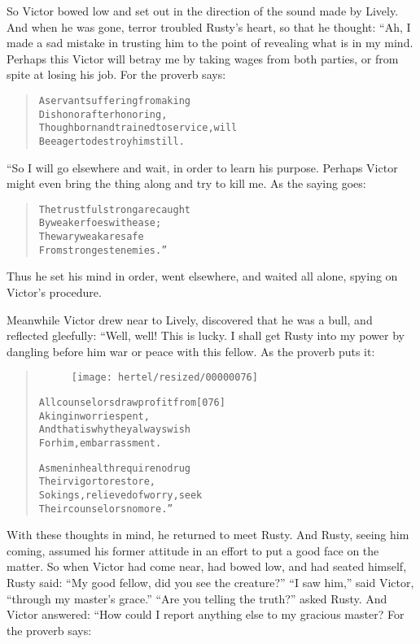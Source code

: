 \documentclass[article, twoside, 10pt]{memoir}
\renewenvironment{verbatim}{%
\begin{quote}%
\vskip -10pt%
\begin{alltt}\normalfont\small}{\end{alltt}%
\end{quote}%
\vskip -10pt
} %
\begin{document}
So Victor bowed low and set out in the direction of the sound made
by Lively. And when he was gone, terror troubled Rusty's heart, so
that he thought: “Ah, I made a sad mistake in trusting him to the
point of revealing what is in my mind. Perhaps this Victor will
betray me by taking wages from both parties, or from spite at
losing his job. For the proverb says:

\begin{verbatim}
A servant suffering from a king
Dishonor after honoring,
Though born and trained to service, will
Be eager to destroy him still.
\end{verbatim}
“So I will go elsewhere and wait, in order to learn his purpose.
Perhaps Victor might even bring the thing along and try to kill me.
As the saying goes:

\begin{verbatim}
The trustful strong are caught
    By weaker foes with ease;
The wary weak are safe
    From strongest enemies.”
\end{verbatim}
Thus he set his mind in order, went elsewhere, and waited all
alone, spying on Victor's procedure.

Meanwhile Victor drew near to Lively, discovered that he was a
bull, and reflected gleefully: “Well, well! This is lucky. I shall
get Rusty into my power by dangling before him war or peace with
this fellow. As the proverb puts it:

\begin{verbatim}
\begin{figure}[p]\texttt{[image: hertel/resized/00000076]}\end{figure}All counselors draw profit from                         [076]
    A king in worries pent,
And that is why they always wish
    For him, embarrassment.

As men in health require no drug
    Their vigor to restore,
So kings, relieved of worry, seek
    Their counselors no more.”
\end{verbatim}
With these thoughts in mind, he returned to meet Rusty. And Rusty,
seeing him coming, assumed his former attitude in an effort to put
a good face on the matter. So when Victor had come near, had bowed
low, and had seated himself, Rusty said:
``My good fellow, did you see the creature?'' ``I saw him,'' said
Victor, ``through my master's grace.''
``Are you telling the truth?'' asked Rusty. And Victor answered:
“How could I report anything else to my gracious master? For the
proverb says:
\end{document}
